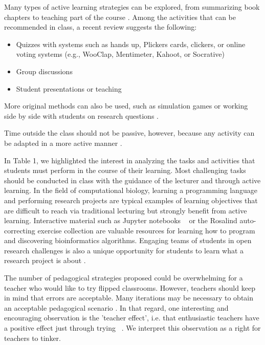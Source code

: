 \documentclass[10pt,letterpaper]{article}
\begin{document}
Many types of active learning strategies can be explored, from summarizing book chapters to teaching part of the course \cite{fiorella_eight_2016}. Among the activities that can be recommended in class, a recent review \cite{delozier_flipped_2017} suggests the following:

\begin{itemize}

\item Quizzes with systems such as hands up, Plickers cards, clickers, 
or online voting systems (e.g., WooClap, Mentimeter, Kahoot, or Socrative)

\item Group discussions

\item Student presentations or teaching

\end{itemize}


More original methods can also be used, such as simulation games \cite{taly2019molecular} or working side by side 
with students on research questions \cite{mazzanti2017can}. 

Time outside the class should not be passive, 
however, because any activity can be adapted in a more active manner \cite{chi_icap_2014}.

In Table 1, we highlighted the interest in analyzing the tasks and activities that students must perform in the course of their learning. 
Most challenging tasks should be conducted in class with the guidance of the lecturer and through active learning. 
In the field of computational biology, learning a programming language and performing research projects are typical examples 
of learning objectives that are difficult to reach via traditional lecturing but strongly benefit from active learning. 
Interactive material such as Jupyter notebooks ~\cite{davies_using_2020,rule_ten_2019} or the Rosalind auto-correcting
exercise collection \cite{compeau_bioinformatics_2018} are valuable resources for learning how to program
and discovering bioinformatics algorithms.
Engaging teams of students in open research challenges is also a unique opportunity for students to learn what a research project is about \cite{abdollahi2018meet}.

The number of pedagogical strategies proposed could be overwhelming for a teacher who would like to try flipped classrooms. 
However, teachers should keep in mind that errors are acceptable. 
Many iterations may be necessary to obtain an acceptable pedagogical scenario \cite{compeau_establishing_2019}. 
In that regard, one interesting and encouraging observation is the 'teacher effect', 
i.e. that enthusiastic teachers have a positive effect just through trying ~\cite{hattie_visible_2008}. 
We interpret this observation as a right for teachers to tinker.
\end{document}
